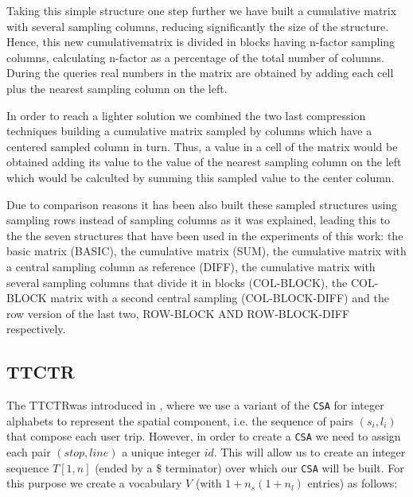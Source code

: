 \documentclass[runningheads]{llncs}
\newcommand{\ttctr}{TTCTR}
\begin{document}
Taking this simple structure one step further we have built a cumulative matrix with several sampling columns, reducing significantly the size of the structure. Hence, this new cumulativematrix is divided in blocks having n-factor sampling columns, calculating n-factor as a percentage
of the total number of columns. During the queries real numbers in the matrix are obtained by adding each cell plus the nearest sampling column on the left.



In order to reach a lighter solution we combined the two last compression techniques building a cumulative matrix sampled by columns which have a centered sampled column in turn. Thus, a value in a cell of the matrix would be obtained adding its value to the value of the nearest sampling column on the left which would be calculted by summing this sampled value to the center column.



Due to comparison reasons it has been also built these sampled structures using sampling rows instead of sampling columns as it was explained, leading this to the the seven structures that have been used in the experiments of this work: the basic matrix (BASIC), the cumulative matrix (SUM), the cumulative matrix with a central sampling column as reference (DIFF), the cumulative matrix with several sampling columns that divide it in blocks (COL-BLOCK), the COL-BLOCK matrix with a second central sampling (COL-BLOCK-DIFF) and the row version of the last two, ROW-BLOCK AND ROW-BLOCK-DIFF respectively.


\subsection{\ttctr}
The \ttctr was introduced in \cite{brisaboa2018new}, where we use a variant of the \texttt{CSA} for integer alphabets to represent the spatial component, i.e. the sequence of pairs $(s_i,l_i)$ that compose each user trip. However, in order to create a \texttt{CSA} we need to assign each pair $(stop,line)$ a unique integer $id$. This will allow us to create an integer sequence $T[1,n]$ (ended by a $\$$  terminator) over which our \texttt{CSA} will be built. For this purpose we create a vocabulary $V$ (with $1+n_s(1+n_l)$ entries)  as follows:
\end{document}
